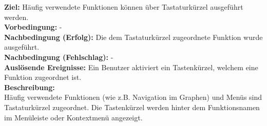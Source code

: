 \label{fa:hotkey}
\textbf{Ziel:} Häufig verwendete Funktionen können über Tastaturkürzel ausgeführt werden.\\
\textbf{Vorbedingung:} -\\
\textbf{Nachbedingung (Erfolg):} Die dem Tastaturkürzel zugeordnete Funktion wurde ausgeführt.\\
\textbf{Nachbedingung (Fehlschlag):} -\\
\textbf{Auslösende Ereignisse:}
Ein Benutzer aktiviert ein Tastenkürzel, welchem eine Funktion zugeordnet ist.\\
\textbf{Beschreibung:}\\
Häufig verwendete Funktionen (wie z.B. Navigation im Graphen) und Menüs sind Tastaturkürzel zugeordnet.
Die Tastenkürzel werden hinter dem Funktionsnamen im Menüleiste oder Kontextmenü angezeigt.
